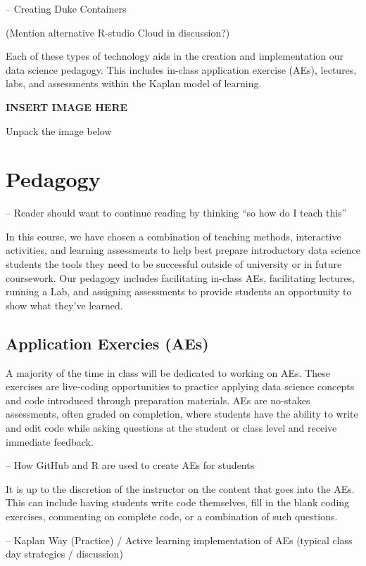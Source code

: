 \documentclass[
  12pt]{article}
\begin{document}
-- Creating Duke Containers

(Mention alternative R-studio Cloud in discussion?)

Each of these types of technology aids in the creation and
implementation our data science pedagogy. This includes in-class
application exercise (AEs), lectures, labs, and assessments within the
Kaplan model of learning.

\textbf{INSERT IMAGE HERE}

Unpack the image below

\hypertarget{sec-ped}{%
\section{Pedagogy}\label{sec-ped}}

-- Reader should want to continue reading by thinking ``so how do I
teach this''

In this course, we have chosen a combination of teaching methods,
interactive activities, and learning assessments to help best prepare
introductory data science students the tools they need to be successful
outside of university or in future coursework. Our pedagogy includes
facilitating in-class AEs, facilitating lectures, running a Lab, and
assigning assessments to provide students an opportunity to show what
they've learned.

\hypertarget{application-exercies-aes}{%
\subsection{Application Exercies (AEs)}\label{application-exercies-aes}}

A majority of the time in class will be dedicated to working on AEs.
These exercises are live-coding opportunities to practice applying data
science concepts and code introduced through preparation materials. AEs
are no-stakes assessments, often graded on completion, where students
have the ability to write and edit code while asking questions at the
student or class level and receive immediate feedback.

-- How GitHub and R are used to create AEs for students

It is up to the discretion of the instructor on the content that goes
into the AEs. This can include having students write code themselves,
fill in the blank coding exercises, commenting on complete code, or a
combination of such questions.

-- Kaplan Way (Practice) / Active learning implementation of AEs
(typical class day strategies / discussion)
\end{document}
